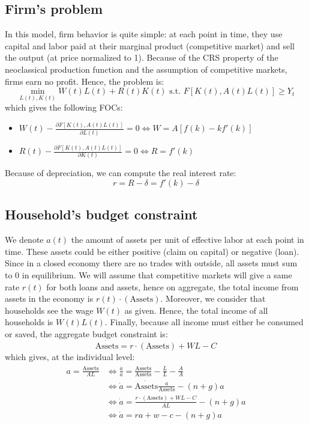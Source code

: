 \documentclass[12pt]{report}
\begin{document}
\subsection{Firm's problem}

In this model, firm behavior is quite simple: at each point in time, they use capital and labor paid at their marginal product (competitive market) and sell the output (at price normalized to 1). Because of the CRS property of the neoclassical production function and the assumption of competitive markets, firms earn no profit. Hence, the problem is: $$\min_{L(t), K(t)} W(t)L(t) + R(t)K(t) \text{ s.t. } F[K(t), A(t)L(t)] \geq Y_t $$ which gives the following FOCs:\begin{itemize}
\item $W(t) - \frac{\partial F[K(t), A(t)L(t)]}{\partial L(t)} = 0 \Leftrightarrow W = A[f(k) - kf'(k)]$
\item $R(t) - \frac{\partial F[K(t), A(t)L(t)]}{\partial K(t)} = 0 \Leftrightarrow R = f'(k)$
\end{itemize} Because of depreciation, we can compute the real interest rate: $$r = R - \delta = f'(k) - \delta $$

\subsection{Household's budget constraint}

We denote $a(t)$ the amount of assets per unit of effective labor at each point in time. These assets could be either positive (claim on capital) or negative (loan). Since in a closed economy there are no trades with outside, all assets must sum to 0 in equilibrium. We will assume that competitive markets will give a same rate $r(t)$ for both loans and assets, hence on aggregate, the total income from assets in the economy is $r(t)\cdot (\text{Assets})$. Moreover, we consider that households see the wage $W(t)$ as given. Hence, the total income of all households is $W(t)L(t)$. Finally, because all income must either be consumed or saved, the aggregate budget constraint is: $$\dot{\text{Assets}} = r\cdot (\text{Assets}) + WL - C $$ which gives, at the individual level: \begin{align*}
a = \frac{\text{Assets}}{AL} & \Leftrightarrow \frac{\dot{a}}{a} = \frac{\dot{\text{Assets}}}{\text{Assets}} - \frac{\dot{L}}{L} - \frac{\dot{A}}{A} \\ & \Leftrightarrow \dot{a} = \dot{\text{Assets}} \frac{a}{\text{Assets}} - (n + g)a \\ & \Leftrightarrow \dot{a} = \frac{r\cdot (\text{Assets}) + WL - C }{AL} - (n + g)a \\ & \Leftrightarrow \dot{a} = ra + w - c - (n + g)a
\end{align*}
\end{document}
